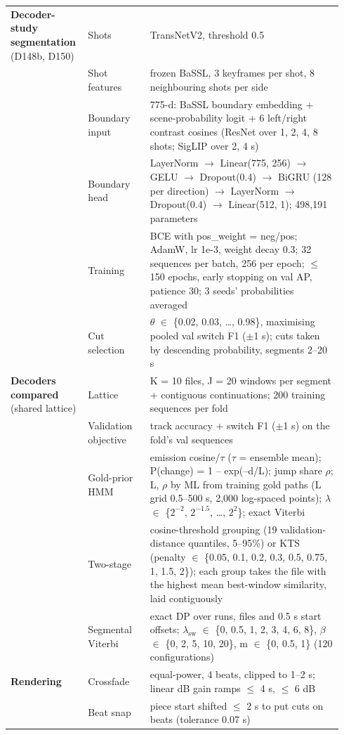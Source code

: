 \begin{longtable}{@{}p{0.2\linewidth}p{0.18\linewidth}p{0.56\linewidth}@{}}
\midrule
\textbf{Decoder-study segmentation} (D148b, D150) & Shots & TransNetV2, threshold 0.5\\
 & Shot features & frozen BaSSL, 3 keyframes per shot, 8 neighbouring shots per side\\
 & Boundary input & 775-d: BaSSL boundary embedding + scene-probability logit + 6 left/right contrast cosines (ResNet over 1, 2, 4, 8 shots; SigLIP over 2, 4 s)\\
 & Boundary head & LayerNorm $\rightarrow$ Linear(775, 256) $\rightarrow$ GELU $\rightarrow$ Dropout(0.4) $\rightarrow$ BiGRU (128 per direction) $\rightarrow$ LayerNorm $\rightarrow$ Dropout(0.4) $\rightarrow$ Linear(512, 1); 498,191 parameters\\
 & Training & BCE with pos\_weight = neg/pos; AdamW, lr 1e-3, weight decay 0.3; 32 sequences per batch, 256 per epoch; $\le$ 150 epochs, early stopping on val AP, patience 30; 3 seeds' probabilities averaged\\
 & Cut selection & $\theta$ $\in$ \{0.02, 0.03, \ldots{}, 0.98\}, maximising pooled val switch F1 ($\pm$1 s); cuts taken by descending probability, segments 2--20 s\\
\midrule
\textbf{Decoders compared} (shared lattice) & Lattice & K = 10 files, J = 20 windows per segment + contiguous continuations; 200 training sequences per fold\\
 & Validation objective & track accuracy + switch F1 ($\pm$1 s) on the fold's val sequences\\
 & Gold-prior HMM & emission cosine/$\tau$ ($\tau$ = ensemble mean); P(change) = 1 -- exp(--d/L); jump share $\rho$; L, $\rho$ by ML from training gold paths (L grid 0.5--500 s, 2,000 log-spaced points); $\lambda$ $\in$ \{$2^{-2}$, $2^{-1.5}$, \ldots{}, $2^{2}$\}; exact Viterbi\\
 & Two-stage & cosine-threshold grouping (19 validation-distance quantiles, 5--95\%) or KTS (penalty $\in$ \{0.05, 0.1, 0.2, 0.3, 0.5, 0.75, 1, 1.5, 2\}); each group takes the file with the highest mean best-window similarity, laid contiguously\\
 & Segmental Viterbi & exact DP over runs, files and 0.5 s start offsets; $\lambda_{\mathrm{sw}}$ $\in$ \{0, 0.5, 1, 2, 3, 4, 6, 8\}, $\beta$ $\in$ \{0, 2, 5, 10, 20\}, m $\in$ \{0, 0.5, 1\} (120 configurations)\\
\midrule
\textbf{Rendering} & Crossfade & equal-power, 4 beats, clipped to 1--2 s; linear dB gain ramps $\le$ 4 s, $\le$ 6 dB\\
 & Beat snap & piece start shifted $\le$ 2 s to put cuts on beats (tolerance 0.07 s)\\

\end{longtable}
